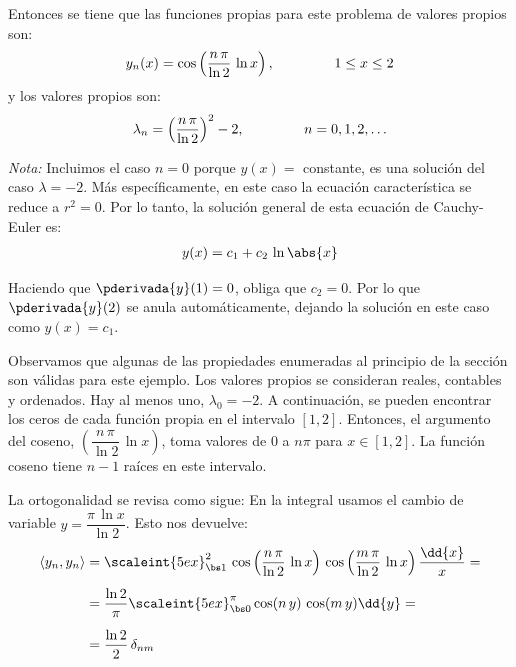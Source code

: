 Entonces se tiene que las funciones propias para este problema de valores propios son:
\begin{align*}
y_{n}(x) = \cos \left( \dfrac{n \, \pi}{\ln 2} \, \ln x \right), \hspace{1.5cm} 1 \leq x \leq 2
\end{align*}
y los valores propios son:
\begin{align*}
\lambda_{n} = \left( \dfrac{n \, \pi}{\ln 2} \right)^{2} - 2, \hspace{1.5cm} n = 0, 1, 2, \ldots
\end{align*}

\emph{Nota:} Incluimos el caso $n = 0$ porque $y (x) =$ constante, es una solución del caso $\lambda = - 2$. Más específicamente, en este caso la ecuación característica se reduce a $r^{2} = 0$. Por lo tanto, la solución general de esta ecuación de Cauchy-Euler es:
\begin{align*}
y (x) = c_{1} + c_{2} \, \ln \abs{x}
\end{align*}

Haciendo que $\pderivada{y} (1) = 0$, obliga que $c_{2} = 0$. Por lo que $\pderivada{y} (2)$ se anula automáticamente, dejando la solución en este caso como $y(x) = c_{1}$.
\par
Observamos que algunas de las propiedades enumeradas al principio de la sección son válidas para este ejemplo. Los valores propios se consideran reales, contables y ordenados. Hay al menos uno, $\lambda_{0} = -2$. A continuación, se pueden encontrar los ceros de cada función propia en el intervalo $[1, 2]$. Entonces, el argumento del coseno, $\left( \dfrac{n \, \pi}{\ln 2} \, \ln x \right)$, toma valores de $0$ a $n \pi$ para $x \in [1, 2]$. La función coseno tiene $n - 1$ raíces en este intervalo.
\par
La ortogonalidad se revisa como sigue: En la integral usamos el cambio de variable $y = \dfrac{\pi \, \ln x}{\ln 2}$. Esto nos devuelve:
\begin{align}
\begin{aligned}[b]
\langle y_{n}, y_{n} \rangle &= \scaleint{5ex}_{\bs 1}^{2} \, \cos \left( \dfrac{n \, \pi}{\ln 2} \, \ln x \right) \, \cos \left( \dfrac{m \, \pi}{\ln 2} \, \ln x \right) \dfrac{\dd{x}}{x} = \\[0.5em]
&= \dfrac{\ln 2}{\pi} \scaleint{5ex}_{\bs 0}^{\pi} \cos (n \, y) \, \cos (m \, y) \dd{y} = \\[0.5em]
&= \dfrac{\ln 2}{2} \, \delta_{nm}
\end{aligned}
\label{eq:ecuacion_04_16}
\end{align}

